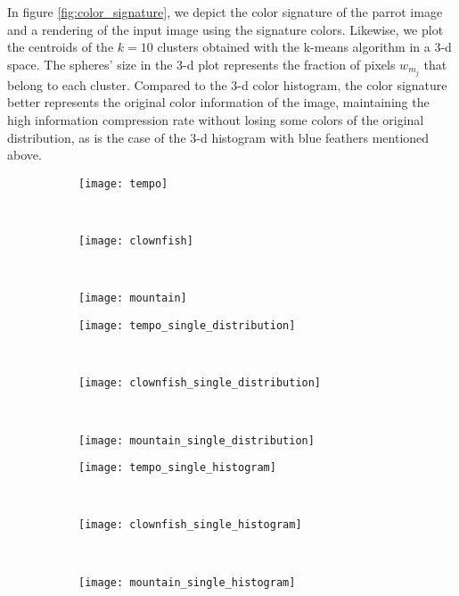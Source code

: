 In figure \ref{fig:color_signature}, we depict the color signature of the parrot image and a rendering of the input image using the signature colors. Likewise, we plot the centroids of the $k = 10$ clusters obtained with the k-means algorithm in a 3-d space. The spheres' size in the 3-d plot represents the fraction of pixels $w_{m_j}$ that belong to each cluster. Compared to the 3-d color histogram, the color signature better represents the original color information of the image, maintaining the high information compression rate without losing some colors of the original distribution, as is the case of the 3-d histogram with blue feathers mentioned above.

\begin{figure}[!ht]
    \centering
    \begin{subfigure}[t]{\textwidth+20pt\relax}
    	\texttt{[image: tempo]}
    \end{subfigure}~ 
    \begin{subfigure}[b]{0.32\textwidth}
        \texttt{[image: clownfish]}
    \end{subfigure}~
    \begin{subfigure}[b]{0.32\textwidth}
        \texttt{[image: mountain]}
    \end{subfigure}\vspace{5pt}
    
    
    \begin{subfigure}[t]{\textwidth+20pt\relax}
    	\texttt{[image: tempo\_single\_distribution]}
    \end{subfigure}~     
    \begin{subfigure}[b]{0.32\textwidth}
        \texttt{[image: clownfish\_single\_distribution]}
    \end{subfigure}~
    \begin{subfigure}[b]{0.32\textwidth}
        \texttt{[image: mountain\_single\_distribution]}
    \end{subfigure}%
    
    
    \begin{subfigure}[t]{\textwidth+20pt\relax}
    	\texttt{[image: tempo\_single\_histogram]}
    \end{subfigure}~     
    \begin{subfigure}[b]{0.32\textwidth}
        \texttt{[image: clownfish\_single\_histogram]}
    \end{subfigure}~
    \begin{subfigure}[b]{0.32\textwidth}
        \texttt{[image: mountain\_single\_histogram]}
    \end{subfigure}%
    

\end{figure}
